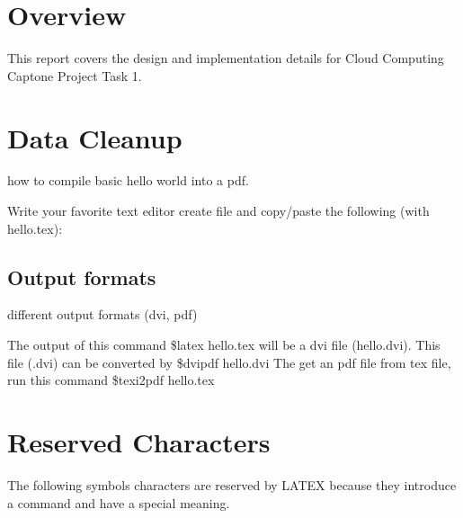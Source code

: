 \documentclass{report}
\begin{document}
  
  

\section{Overview}
 This report covers the design and implementation details for Cloud Computing Captone Project Task 1. 
 
\section{Data Cleanup}
 
how to compile basic hello world into a pdf.
 
Write your favorite text editor create file and copy/paste the following (with hello.tex):
 
\subsection{Output formats}
 
different output formats (dvi, pdf)
 
The output of this command \$latex hello.tex will be a dvi 
file (hello.dvi). This file (.dvi) can be converted by \$dvipdf 
hello.dvi The get an pdf file from tex file, run this 
command \$texi2pdf hello.tex
 
 
\section{Reserved Characters}
 
The following symbols characters are reserved by LATEX because 
they introduce a command and have a special meaning.
 
\end{document}
